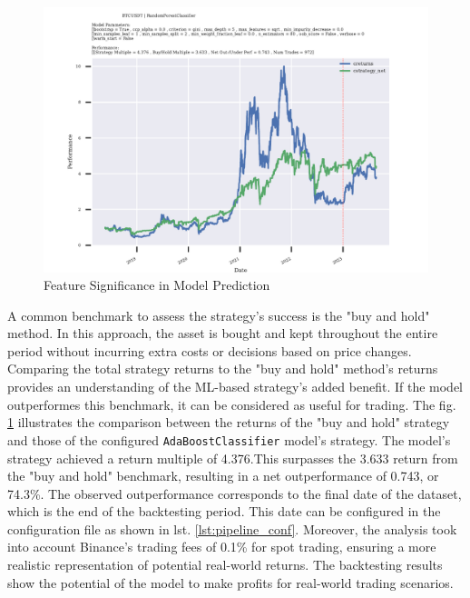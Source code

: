 \begin{figure}[h]
\centering
\begin{adjustbox}{max width=1.3\textwidth,center}
\includegraphics[scale=1.3]{./pdf/report/backtest_res.pdf}
\end{adjustbox}
\caption{Feature Significance in Model Prediction}
\label{fig:backtest_res}
\end{figure}

A common benchmark to assess the strategy's success is the "buy and hold" method.
In this approach, the asset is bought and kept throughout the entire period without incurring extra costs or decisions based on price changes.
Comparing the total strategy returns to the "buy and hold" method's returns provides an understanding of the ML-based strategy's added benefit.
If the model outperformes this benchmark, it can be considered as useful for trading.
The fig. \ref{fig:backtest_res} illustrates the comparison between the returns of the "buy and hold" strategy and those of the configured \texttt{AdaBoostClassifier} model's strategy.
The model's strategy achieved a return multiple of 4.376.This surpasses the 3.633 return from the "buy and hold" benchmark, resulting in a net outperformance of 0.743, or 74.3\%.
The observed outperformance corresponds to the final date of the dataset, which is the end of the backtesting period.
This date can be configured in the configuration file as shown in lst. \ref{lst:pipeline_conf}.
Moreover, the analysis took into account Binance's trading fees of 0.1\% for spot trading, ensuring a more realistic representation of potential real-world returns.
The backtesting results show the potential of the model to make profits for real-world trading scenarios.


